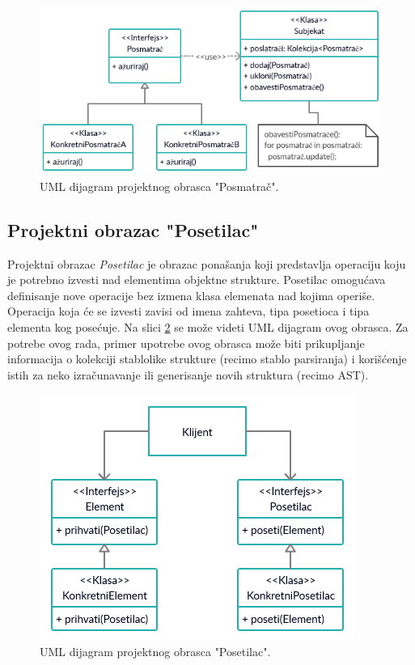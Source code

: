 \begin{figure}[h!]
\centering
\includegraphics[scale=0.8]{images/design_observer.png}
\caption{UML dijagram projektnog obrasca "Posmatrač".}
\label{fig:UMLObserver}
\end{figure}

\subsection{Projektni obrazac "Posetilac"}
\label{subsec:DesignPatternsListener}

Projektni obrazac \emph{Posetilac} je obrazac ponašanja koji predstavlja operaciju koju je potrebno izvesti nad elementima objektne strukture. Posetilac omogućava definisanje nove operacije bez izmena klasa elemenata nad kojima operiše. Operacija koja će se izvesti zavisi od imena zahteva, tipa posetioca i tipa elementa kog posećuje. Na slici \ref{fig:UMLVisitor} se može videti UML dijagram \cite{UML} ovog obrasca. Za potrebe ovog rada, primer upotrebe ovog obrasca može biti prikupljanje informacija o kolekciji stablolike strukture (recimo stablo parsiranja) i korišćenje istih za neko izračunavanje ili generisanje novih struktura (recimo AST). 

\begin{figure}[h!]
    \centering
    \includegraphics[scale=0.8]{images/design_visitor.png}
    \caption{UML dijagram projektnog obrasca "Posetilac".} 
    \label{fig:UMLVisitor}
\end{figure}